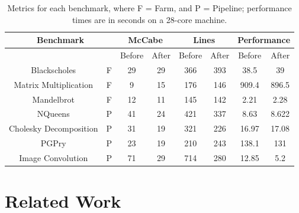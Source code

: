 
\begin{table}
	\begin{tabular}{|c|c|c|c|c|c|c|c|}
		\hline \hline
		\multicolumn{2}{|c|}{\textbf{Benchmark}} & \multicolumn{2}{|c|}{McCabe} & \multicolumn{2}{|c|}{Lines} & \multicolumn{2}{|c|}{Performance}  \\
		\hline
		& & Before & After & Before & After & Before & After  \\
		\hline
		Blackscholes & F &  29 & 29 & 366 & 393 & 38.5 & 39  \\
		Matrix Multiplication & F & 9 & 15 & 176 & 146 & 909.4 & 896.5  \\
		Mandelbrot & F  & 12 & 11 & 145 & 142 & 2.21 & 2.28 \\
		NQueens & P & 41 & 24 & 421 & 337 & 8.63 & 8.622  \\
		Cholesky Decomposition & P & 31  & 19 & 321 & 226 & 16.97 & 17.08 \\
		PGPry & P & 23 & 19 & 210 & 243 & 138.1 & 131 \\
		Image Convolution & P & 71 & 29 & 714 & 280 & 12.85  & 5.2 \\
		\hline \hline
	\end{tabular}
	\caption{Metrics for each benchmark, where F = Farm, and P = Pipeline; performance times are in seconds on a 28-core machine.}
	\label{fig:benchmarks2}
\end{table}

\section{Related Work}

